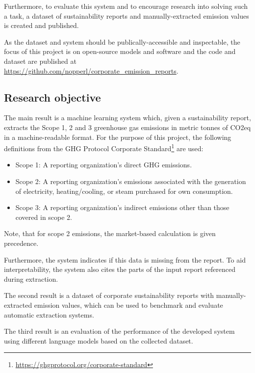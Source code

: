 \documentclass[]{article}
\begin{document}
Furthermore, to evaluate this system and to encourage research into solving such a task, a dataset of sustainability reports and manually-extracted emission values is created and published.

As the dataset and system should be publically-accessible and inspectable, the focus of this project is on open-source models and software and the code and dataset are published at \url{https://github.com/nopperl/corporate_emission_reports}.

\subsection{Research objective}
The main result is a machine learning system which, given a sustainability report, extracts the Scope 1, 2 and 3 greenhouse gas emissions in metric tonnes of CO2eq in a machine-readable format. For the purpose of this project, the following definitions from the GHG Protocol Corporate Standard\footnote{\url{https://ghgprotocol.org/corporate-standard}} are used:

\begin{itemize}
	\item Scope 1: A reporting organization’s direct GHG emissions.
	\item Scope 2: A reporting organization’s emissions associated with the generation of electricity, heating/cooling, or steam purchased for own consumption.
	\item Scope 3: A reporting organization’s indirect emissions other than those covered in scope 2.
\end{itemize}

Note, that for scope 2 emissions, the market-based calculation is given precedence.

Furthermore, the system indicates if this data is missing from the report. To aid interpretability, the system also cites the parts of the input report referenced during extraction.

The second result is a dataset of corporate sustainability reports with manually-extracted emission values, which can be used to benchmark and evaluate automatic extraction systems.

The third result is an evaluation of the performance of the developed system using different language models based on the collected dataset.
\end{document}
